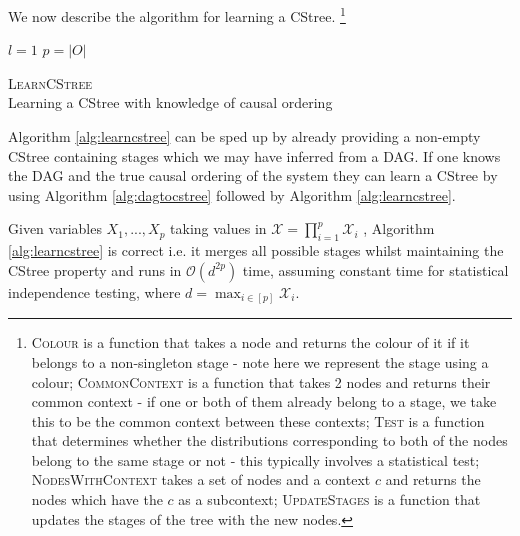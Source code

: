 \documentclass{tufte-book}
\begin{document}
 \newpage 
We now describe the algorithm for learning a CStree.  \footnote{\textsc{Colour} is a function that takes a node and returns the colour of it if it belongs to a non-singleton stage - note here we represent the stage using a colour; \textsc{CommonContext} is a function that takes 2 nodes and returns their common context - if one or both of them already belong to a stage, we take this to be the common context between these contexts; \textsc{Test} is a function that determines whether the distributions corresponding to both of the nodes belong to the same stage or not - this typically involves a statistical test; \textsc{NodesWithContext} takes a set of nodes and a context $c$ and returns the nodes which have the $c$ as a subcontext; \textsc{UpdateStages} is a function that updates the stages of the tree with the new nodes.} 

\begin{algorithm}[H]\label{alg:learncstree}
\SetAlgoLined
{}
$l=1$\;
$p=|O|$\;
\caption{\textsc{LearnCStree} \\ Learning a CStree with knowledge of causal ordering}
\end{algorithm}

Algorithm \ref{alg:learncstree} can be sped up by already providing a non-empty CStree containing stages which we may have inferred from a DAG. If one knows the DAG and the true causal ordering of the system they can learn a CStree by using Algorithm \ref{alg:dagtocstree} followed by Algorithm \ref{alg:learncstree}.


\begin{theorem}\label{thm:learncstreecorrectness}
Given variables $X_1,...,X_p$ taking values in $\mathcal{X}=\prod_{i=1}^p \mathcal{X}_i$ , Algorithm \ref{alg:learncstree} is correct i.e. it merges all possible stages whilst maintaining the CStree property and runs in $\mathcal{O}(d^{2p})$ time, assuming constant time for statistical independence testing, where $d=\max_{i \in [p]}\mathcal{X}_i$.

\end{theorem}
\end{document}
